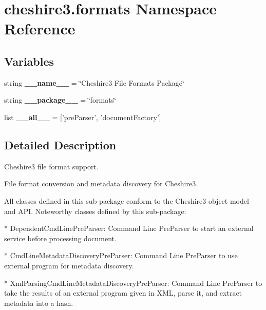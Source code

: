 \hypertarget{namespacecheshire3_1_1formats}{\section{cheshire3.\-formats Namespace Reference}
\label{namespacecheshire3_1_1formats}
}
\subsection*{Variables}
\begin{DoxyCompactItemize}
\item 
\hypertarget{namespacecheshire3_1_1formats_a94933a34394088602c8cb5094987d8b8}{string {\bfseries \-\_\-\-\_\-name\-\_\-\-\_\-} = \char`\"{}Cheshire3 File Formats Package\char`\"{}}\label{namespacecheshire3_1_1formats_a94933a34394088602c8cb5094987d8b8}

\item 
\hypertarget{namespacecheshire3_1_1formats_a43e9b92c9141e43aa627c75ad625539f}{string {\bfseries \-\_\-\-\_\-package\-\_\-\-\_\-} = \char`\"{}formats\char`\"{}}\label{namespacecheshire3_1_1formats_a43e9b92c9141e43aa627c75ad625539f}

\item 
\hypertarget{namespacecheshire3_1_1formats_a299101c1663bc8d38c16134d3093f029}{list {\bfseries \-\_\-\-\_\-all\-\_\-\-\_\-} = \mbox{[}'pre\-Parser', 'document\-Factory'\mbox{]}}\label{namespacecheshire3_1_1formats_a299101c1663bc8d38c16134d3093f029}

\end{DoxyCompactItemize}


\subsection{Detailed Description}
\begin{DoxyVerb}Cheshire3 file format support.

File format conversion and metadata discovery for Cheshire3.

All classes defined in this sub-package conform to the Cheshire3 object model 
and API. Noteworthy classes defined by this sub-package:

 * DependentCmdLinePreParser:    
   Command Line PreParser to start an external service before processing
   document.
    
 * CmdLineMetadataDiscoveryPreParser:
   Command Line PreParser to use external program for metadata discovery.
        
 * XmlParsingCmdLineMetadataDiscoveryPreParser:
   Command Line PreParser to take the results of an external program given
   in XML, parse it, and extract metadata into a hash.\end{DoxyVerb}
 